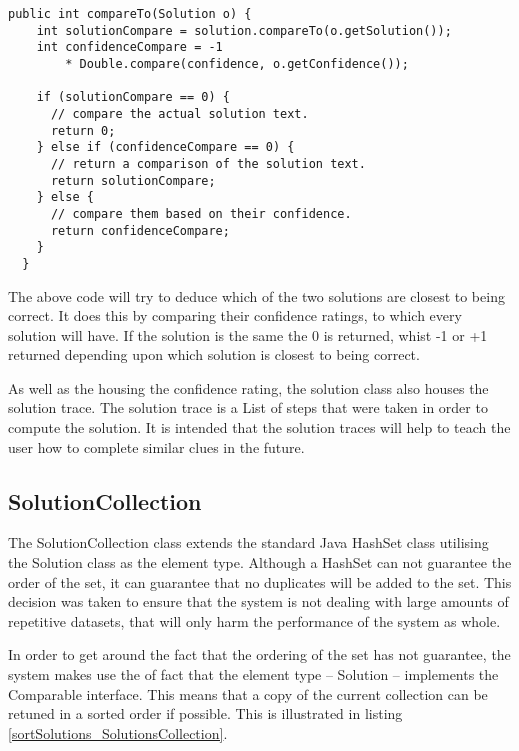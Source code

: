 \begin{lstlisting}[caption={compareTo() compares two solutions},
                   label=compareToSolution] 
  public int compareTo(Solution o) {
    int solutionCompare = solution.compareTo(o.getSolution());
    int confidenceCompare = -1
        * Double.compare(confidence, o.getConfidence());

    if (solutionCompare == 0) {
      // compare the actual solution text.
      return 0;
    } else if (confidenceCompare == 0) {
      // return a comparison of the solution text. 
      return solutionCompare;
    } else {
      // compare them based on their confidence.
      return confidenceCompare;
    }
  }
\end{lstlisting}

The above code will try to deduce which of the two solutions are closest to 
being correct. It does this by comparing their confidence ratings, to which 
every solution will have. If the solution is the same the 0 is returned, whist 
-1 or +1 returned depending upon which solution is closest to being correct.

As well as the housing the confidence rating, the solution class also houses the
solution trace. The solution trace is a List of steps that were taken in order 
to compute the solution. It is intended that the solution traces will help to 
teach the user how to complete similar clues in the future. 


\subsection{SolutionCollection}
\label{sub:solution_collection}

The SolutionCollection class extends the standard Java HashSet class utilising 
the Solution class as the element type. Although a HashSet can not guarantee the
order of the set, it can guarantee that no duplicates will be added to the set.
This decision was taken to ensure that the system is not dealing with large 
amounts of repetitive datasets, that will only harm the performance of the 
system as whole.

In order to get around the fact that the ordering of the set has not guarantee,
the system makes use the of fact that the element type -- Solution -- implements
the Comparable interface. This means that a copy of the current collection can 
be retuned in a sorted order if possible. This is illustrated in listing 
\ref{sortSolutions_SolutionsCollection}.

